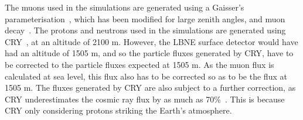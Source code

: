 The muons used in the simulations are generated using a Gaisser's parameterisation~\citep{Gaisser}, which has been modified for large zenith angles, and muon decay~\citep{PhysRevD.58.092005}. The protons and neutrons used in the simulations are generated using CRY~\citep{CRY,CRY2}, at an altitude of 2100 m. However, the LBNE surface detector would have had an altitude of 1505 m, and so the particle fluxes generated by CRY, have to be corrected to the particle fluxes expected at 1505 m. As the muon flux is calculated at sea level, this flux also has to be corrected so as to be the flux at 1505 m. The fluxes generated by CRY are also subject to a further correction, as CRY underestimates the cosmic ray flux by as much as 70\%~\citep{LBNE7517}. This is because CRY only considering protons striking the Earth's atmosphere. \\

